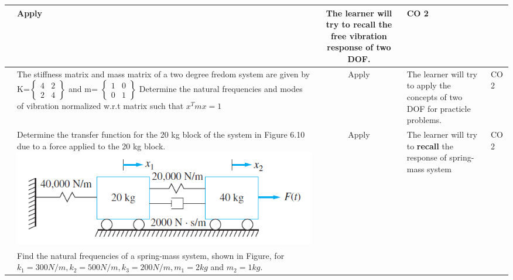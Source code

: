 \documentclass[11pt,paper=a4,answers]{exam}
\begin{document}
\begin{flushleft}
\begin{longtable}{|>{\centering\arraybackslash}p{0.8cm}  | >{\raggedright\arraybackslash}p{6.5cm}  | c | >{\raggedright\arraybackslash}p{5cm} |>{\centering\arraybackslash}p{1cm}|}
&	Apply&	The learner will try to \textbf{recall} the free vibration response of two DOF.&	CO 2\\
	\hline 
	8& The stiffness matrix and mass matrix of a two degree fredom system are given by K=$\begin{Bmatrix}
		4&2\\2&4
	\end{Bmatrix}$ and m= $\begin{Bmatrix}
	1&0\\0&1
\end{Bmatrix}$ Determine the natural frequencies and modes of vibration normalized w.r.t matrix such that $x^{T}mx=1$
	&	Apply&	The learner will try to apply the concepts of two DOF for practicle problems. &	CO 2\\
		\hline 
9&	Determine the transfer function for the 20 kg block of the system in Figure 6.10 due to a
force applied to the 20 kg block.\includegraphics[scale=0.3]{6.10.png}
&	Apply&	The learner will try to \textbf{recall} the response of spring-mass system&	CO 2\\
	\hline 
10&	Find the natural frequencies of a spring-mass system, shown in Figure, for $k_1=300 N/m, k_2=500 N/m, k_3=200 N/m, m_1=2kg $ and $m_2=1kg$.

\end{longtable}
\end{flushleft}
\end{document}
